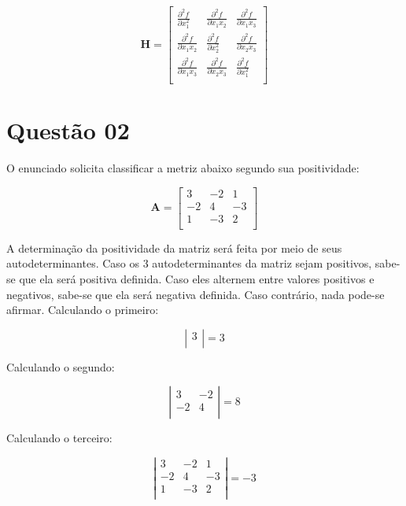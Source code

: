 \documentclass[10pt, a4paper]{article}
\begin{document}
\[
  \mathbf{H} =
  \left[ {\begin{array}{ccc}
    \frac{\partial^2 f}{\partial x_1^2} & \frac{\partial^2 f}{\partial x_1x_2} & \frac{\partial^2 f}{\partial x_1x_3} \\
    \frac{\partial^2 f}{\partial x_1x_2} & \frac{\partial^2 f}{\partial x_2^2} & \frac{\partial^2 f}{\partial x_2x_3} \\
    \frac{\partial^2 f}{\partial x_1x_3} & \frac{\partial^2 f}{\partial x_2x_3} & \frac{\partial^2 f}{\partial x_1^2} \\
  \end{array} } \right]
\]

\section[q02]{Questão 02}

O enunciado solicita classificar a metriz abaixo segundo sua positividade:

\[
  \mathbf{A} =
  \left[ {\begin{array}{ccc}
    3 & -2 & 1 \\
    -2 & 4 & -3 \\
    1 & -3 & 2 \\
  \end{array} } \right]
\]

A determinação da positividade da matriz será feita por meio de seus autodeterminantes. 
Caso os 3 autodeterminantes da matriz sejam positivos, sabe-se que ela será positiva definida. 
Caso eles alternem entre valores positivos e negativos, sabe-se que ela será negativa definida. Caso contrário,
nada pode-se afirmar. Calculando o primeiro:

\[
  \left| {\begin{array}{c}
    3\\
  \end{array} } \right| = 3
\]

Calculando o segundo:

\[
  \left| {\begin{array}{cc}
    3 & -2 \\
    -2 & 4 \\
  \end{array} } \right| = 8
\]

Calculando o terceiro:

\[
  \left| {\begin{array}{ccc}
    3 & -2 & 1 \\
    -2 & 4 & -3 \\
    1 & -3 & 2 \\
  \end{array} } \right| = -3
\]
\end{document}
